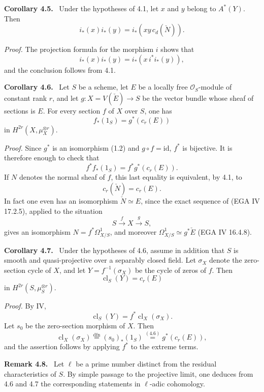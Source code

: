 \documentclass[11pt]{article}
\newenvironment{statement}[1]{\par\medskip\noindent\textbf{#1.}\ }{\par\medskip}
\providecommand{\cl}{\operatorname{cl}}
\providecommand{\cl}{\operatorname{cl}}
\begin{document}
\begin{statement}{Corollary 4.5}
Under the hypotheses of 4.1, let $x$ and $y$ belong to $A^*(Y)$. Then
\[
i_*(x)i_*(y)=i_*(xy\,c_d(\check N)).
\]
\end{statement}

\emph{Proof.} The projection formula for the morphism $i$ shows that
\[
i_*(x)i_*(y)=i_*(x\,i^*i_*(y)),
\]
and the conclusion follows from 4.1.

\begin{statement}{Corollary 4.6}
Let $S$ be a scheme, let $E$ be a locally free $\mathcal O_S$-module of constant rank $r$, and let $g:X=V(\check E)\to S$ be the vector bundle whose sheaf of sections is $E$. For every section $f$ of $X$ over $S$, one has
\[
f_*(1_S)=g^*(c_r(E))
\]
in $H^{2r}(X,\mu_X^{\otimes r})$.
\end{statement}

\emph{Proof.} Since $g^*$ is an isomorphism (1.2) and $g\circ f=\mathrm{id}$, $f^*$ is bijective. It is therefore enough to check that
\[
f^*f_*(1_S)=f^*g^*(c_r(E)).
\]
If $N$ denotes the normal sheaf of $f$, this last equality is equivalent, by 4.1, to
\[
c_r(\check N)=c_r(E).
\]
In fact one even has an isomorphism $\check N\simeq E$, since the exact sequence of (EGA IV 17.2.5), applied to the situation
\[
S\xrightarrow{f} X\xrightarrow{g} S,
\]
gives an isomorphism $N=f^*\Omega^1_{X/S}$, and moreover $\Omega^1_{X/S}\simeq g^*\check E$ (EGA IV 16.4.8).

\begin{statement}{Corollary 4.7}
Under the hypotheses of 4.6, assume in addition that $S$ is smooth and quasi-projective over a separably closed field. Let $\sigma_X$ denote the zero-section cycle of $X$, and let $Y=f^{-1}(\sigma_X)$ be the cycle of zeros of $f$. Then
\[
\cl_S(Y)=c_r(E)
\]
in $H^{2r}(S,\mu_S^{\otimes r})$.
\end{statement}

\emph{Proof.} By IV,
\[
\cl_S(Y)=f^*\cl_X(\sigma_X).
\]
Let $s_0$ be the zero-section morphism of $X$. Then
\[
\cl_X(\sigma_X)\stackrel{\mathrm{dfn}}{=}(s_0)_*(1_S)\stackrel{(4.6)}{=}g^*(c_r(E)),
\]
and the assertion follows by applying $f^*$ to the extreme terms.

\begin{statement}{Remark 4.8}
Let $\ell$ be a prime number distinct from the residual characteristics of $S$. By simple passage to the projective limit, one deduces from 4.6 and 4.7 the corresponding statements in $\ell$-adic cohomology.
\end{statement}
\end{document}
